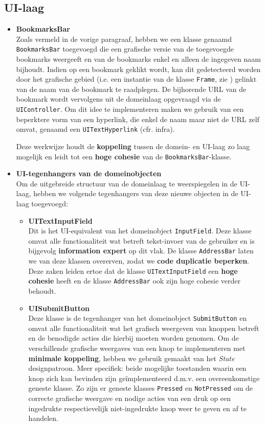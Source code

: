 \documentclass[12pt]{article}
\begin{document}
\subsection{UI-laag}
\begin{itemize}
	\item \textbf{BookmarksBar}\\
	Zoals vermeld in de vorige paragraaf, hebben we een klasse genaamd \texttt{BookmarksBar} toegevoegd die een grafische versie van de toegevoegde bookmarks weergeeft en van de bookmarks enkel en alleen de ingegeven naam bijhoudt. Indien op een bookmark geklikt wordt, kan dit gedetecteerd worden door het grafische gebied (i.e. een instantie van de klasse \texttt{Frame}, zie ) gelinkt van de naam van de bookmark te raadplegen. De bijhorende URL van de bookmark wordt vervolgens uit de domeinlaag opgevraagd via de \texttt{UIController}. Om dit idee te implementeren maken we gebruik van een beperktere vorm van een hyperlink, die enkel de naam maar niet de URL zelf omvat, genaamd een \texttt{UITextHyperlink} (cfr. infra).
	
	Deze werkwijze houdt de \textbf{koppeling} tussen de domein- en UI-laag zo laag mogelijk en leidt tot een \textbf{hoge cohesie} van de \texttt{BookmarksBar}-klasse.
	\item  \textbf{UI-tegenhangers van de domeinobjecten}\\
	Om de uitgebreide structuur van de domeinlaag te weerspiegelen in de UI-laag, hebben we volgende tegenhangers van deze nieuwe objecten in de UI-laag toegevoegd:
	\begin{itemize}
		\item \textbf{UITextInputField}\\
		Dit is het UI-equivalent van het domeinobject \texttt{InputField}. Deze klasse omvat alle functionaliteit wat betreft tekst-invoer van de gebruiker en is bijgevolg \textbf{information expert} op dit vlak. De klasse \texttt{AddressBar} laten we van deze klassen overerven, zodat we \textbf{code duplicatie beperken}. Deze zaken leiden ertoe dat de klasse \texttt{UITextInputField} een \textbf{hoge cohesie} heeft en de klasse \texttt{AddressBar} ook zijn hoge cohesie verder behoudt.
		
		\item \textbf{UISubmitButton}\\
		Deze klasse is de tegenhanger van het domeinobject \texttt{SubmitButton} en omvat alle functionaliteit wat het grafisch weergeven van knoppen betreft en de benodigde acties die hierbij moeten worden genomen. Om de verschillende grafische weergaves van een knop te implementeren met \textbf{minimale koppeling}, hebben we gebruik gemaakt van het \textit{State} designpatroon. Meer specifiek: beide mogelijke toestanden waarin een knop zich kan bevinden zijn geïmplementeerd d.m.v. een overeenkomstige geneste klasse. Zo zijn er geneste klasses \texttt{Pressed} en \texttt{NotPressed} om de correcte grafische weergave en nodige acties van een druk op een ingedrukte respectievelijk niet-ingedrukte knop weer te geven en af te handelen.
		

\end{itemize}
\end{itemize}
\end{document}
